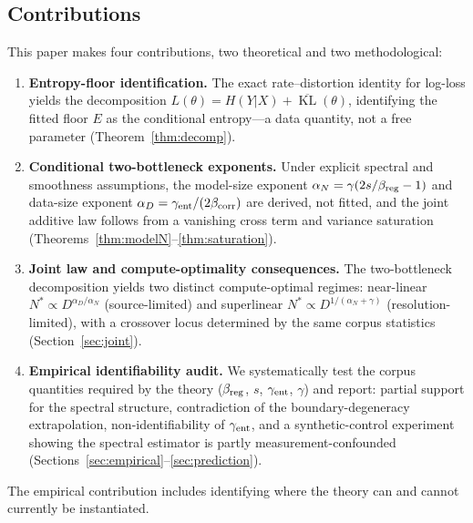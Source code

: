 \documentclass[entropy,article,submit,moreauthors,pdftex]{Definitions/mdpi}
\newcommand{\KL}{\operatorname{KL}}
\begin{document}
\subsection{Contributions}
This paper makes four contributions, two theoretical and two methodological:
\begin{enumerate}[label=\textbf{(\roman*)}]
\item \textbf{Entropy-floor identification.}
  The exact rate--distortion identity for log-loss yields the decomposition
  $L(\theta)=H(Y|X)+\overline{\KL}(\theta)$, identifying the fitted floor $E$
  as the conditional entropy---a data quantity, not a free parameter
  (Theorem~\ref{thm:decomp}).
\item \textbf{Conditional two-bottleneck exponents.}
  Under explicit spectral and smoothness assumptions, the model-size exponent
  $\alpha_N=\gamma(2s/\beta_{\rm reg}-1)$ and data-size exponent
  $\alpha_D=\gamma_{\rm ent}/(2\beta_{\rm corr})$ are derived, not fitted, and
  the joint additive law follows from a vanishing cross term and variance
  saturation (Theorems~\ref{thm:modelN}--\ref{thm:saturation}).
\item \textbf{Joint law and compute-optimality consequences.}
  The two-bottleneck decomposition yields two distinct compute-optimal regimes:
  near-linear $N^*\!\propto\!D^{\alpha_D/\alpha_N}$ (source-limited) and
  superlinear $N^*\!\propto\!D^{1/(\alpha_N+\gamma)}$ (resolution-limited), with
  a crossover locus determined by the same corpus statistics
  (Section~\ref{sec:joint}).
\item \textbf{Empirical identifiability audit.}
  We systematically test the corpus quantities required by the theory
  ($\beta_{\rm reg}$, $s$, $\gamma_{\rm ent}$, $\gamma$) and report: partial
  support for the spectral structure, contradiction of the boundary-degeneracy
  extrapolation, non-identifiability of $\gamma_{\rm ent}$, and a
  synthetic-control experiment showing the spectral estimator is partly
  measurement-confounded
  (Sections~\ref{sec:empirical}--\ref{sec:prediction}).
\end{enumerate}
The empirical contribution includes identifying where the theory can and
cannot currently be instantiated.
\end{document}
